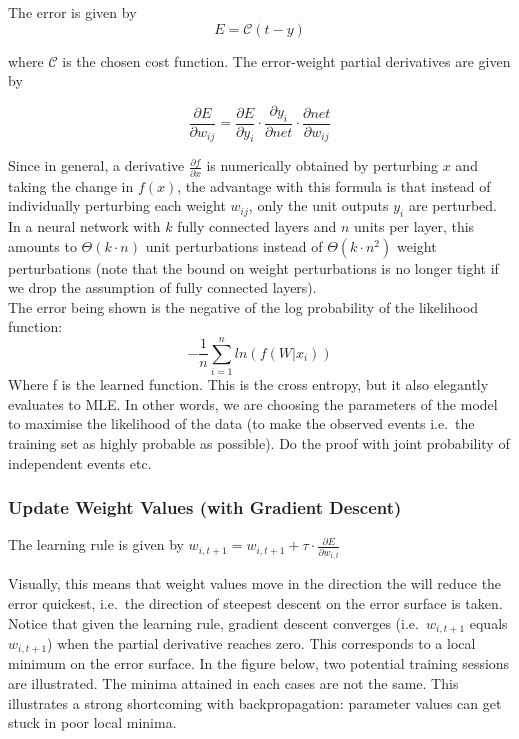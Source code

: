 \documentclass[a4paper,11pt]{article}
\begin{document}
The error is given by 
\begin{equation}
E = \mathcal{C}(t-y)
\end{equation}

where $\mathcal{C}$ is the chosen cost function. The error-weight partial derivatives are given by

\begin{equation}
\frac{\partial{E}}{\partial{w_{ij}}} = \frac{\partial{E}}{\partial{y_{i}}} \cdot \frac{\partial{y_{i}}}{\partial{net}} \cdot \frac{\partial{net}}{\partial{w_{ij}}}
\end{equation}

Since in general, a derivative $\frac{\partial{f}}{\partial{x}}$ is numerically obtained by perturbing $x$ and taking the change in $f(x)$, the advantage with this formula is that instead of individually perturbing each weight $w_{ij}$, only the unit outputs $y_{i}$ are perturbed. In a neural network with $k$ fully connected layers and $n$ units per layer, this amounts to $\Theta(k \cdot n)$ unit perturbations instead of $\Theta(k \cdot n^{2})$ weight perturbations (note that the bound on weight perturbations is no longer tight if we drop the assumption of fully connected layers). \\

The error being shown is the negative of the log probability of the likelihood function:
\begin{equation}
-\frac{1}{n}\sum\limits_{i=1}^n ln(f(W|x_i))
\end{equation}
Where f is the learned function. This is the cross entropy, but it also elegantly evaluates to MLE. In other words, we are choosing the parameters of the model to maximise the likelihood of the data (to make the observed events i.e.\ the training set as highly probable as possible). Do the proof with joint probability of independent events etc. \\


\subsubsection{Update Weight Values (with Gradient Descent)}

The learning rule is given by $w_{i,t+1} = w_{i,t+1} + \tau \cdot \frac{\partial{E}}{\partial{w_{i,t}}}$

Visually, this means that weight values move in the direction the will reduce the error quickest, i.e.\ the direction of steepest descent on the error surface is taken. Notice that given the learning rule, gradient descent converges (i.e.\ $w_{i,t+1}$ equals $w_{i,t+1}$) when the partial derivative reaches zero. This corresponds to a local minimum on the error surface. In the figure below, two potential training sessions are illustrated. The minima attained in each cases are not the same. This illustrates a strong shortcoming with backpropagation: parameter values can get stuck in poor local minima.
\end{document}
